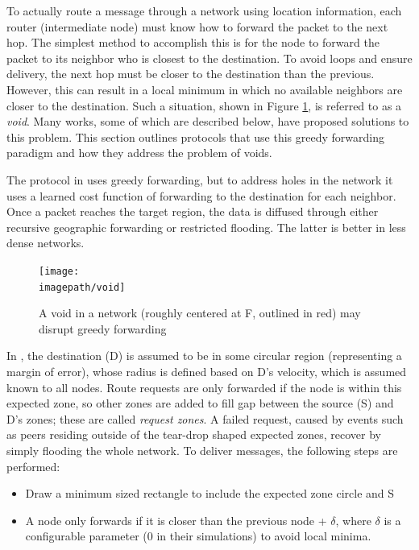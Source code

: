 \documentclass[conference]{IEEEtran}
\newcommand{\imagepath}{../../images/external/location_routing}
\begin{document}
To actually route a message through a network using location information, each router (intermediate node) must know how to forward the packet to the next hop.
The simplest method to accomplish this is for the node to forward the packet to its neighbor who is closest to the destination.
To avoid loops and ensure delivery, the next hop must be closer to the destination than the previous.
However, this can result in a local minimum in which no available neighbors are closer to the destination.
Such a situation, shown in Figure \ref{fig:network-void}, is referred to as a \emph{void}.
Many works, some of which are described below, have proposed solutions to this problem.
This section outlines protocols that use this greedy forwarding paradigm and how they address the problem of voids.

The protocol in \cite{Yu01geographicaland} uses greedy forwarding, but to address holes in the network it uses a learned cost function of forwarding to the destination for each neighbor.  Once a packet reaches the target region, the data is diffused through either recursive geographic forwarding or restricted flooding.  The latter is better in less dense networks.

\begin{figure}
\label{fig:network-void}
\centering
\texttt{[image: \\imagepath/void]}
\caption{A void in a network (roughly centered at F, outlined in red) may disrupt greedy forwarding}
\end{figure}


In \cite{Ko98location-aidedrouting}, the destination (D) is assumed to be in some circular region (representing a margin of error), whose radius is defined based on D's velocity, which is assumed known to all nodes.
Route requests are only forwarded if the node is within this expected zone, so other zones are added to fill gap between the source (S) and D's zones; these are called \emph{request zones}.
A failed request, caused by events such as peers residing outside of the tear-drop shaped expected zones, recover by simply flooding the whole network.
To deliver messages, the following steps are performed:
\begin{itemize}
 	\item Draw a minimum sized rectangle to include the expected zone circle and S
	\item A node only forwards if it is closer than the previous node + $\delta$, where $\delta$ is a configurable parameter (0 in their simulations) to avoid local minima.
\end{itemize}
\end{document}
